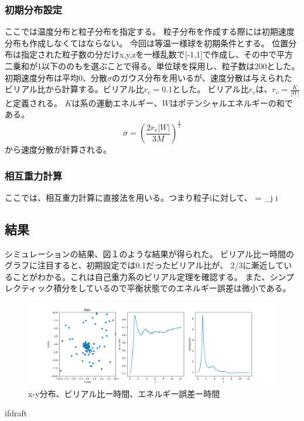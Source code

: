 \documentclass{jsarticle}
\begin{document}
\subsubsection{初期分布設定} 
ここでは温度分布と粒子分布を指定する。
粒子分布を作成する際には初期速度分布も作成しなくてはならない。
今回は等温一様球を初期条件とする。
位置分布は指定された粒子数の分だけx,y,zを一様乱数で[-1,1]で作成し、その中で平方二乗和が1以下ののもを選ぶことで得る。単位球を採用し、粒子数は200とした。
初期速度分布は平均0、分散$\sigma$のガウス分布を用いるが、速度分散は与えられたビリアル比から計算する。ビリアル比$r_v=0.1$とした。
ビリアル比$r_v$は、$r_v = \frac{K}{|W|}$と定義される。
$K$は系の運動エネルギー、$W$はポテンシャルエネルギーの和である。
\begin{equation}
    \sigma = (\frac{2r_v|W|}{3M})^{\frac{1}{2}}
\end{equation}
から速度分散が計算される。
\subsubsection{相互重力計算}
ここでは、相互重力計算に直接法を用いる。つまり粒子iに対して、
 = \sum_{j i}
\subsection {結果}
シミュレーションの結果、図１のような結果が得られた。
ビリアル比ー時間のグラフに注目すると、初期設定では0.1だったビリアル比が、
2/3に漸近していることがわかる。これは自己重力系のビリアル定理を確認する。
また、シンプレクティック積分をしているので平衡状態でのエネルギー誤差は微小である。
\begin{figure}[b]
    \label{fig:result}
    \includegraphics[width=\textwidth,natwidth=1000,natheight=642]{fig.png}
    \caption{x-y分布、ビリアル比ー時間、エネルギー誤差ー時間}
\end{figure}
\expandafter\ifx\csname ifdraft\endcsname\relax
  
\end{document}
